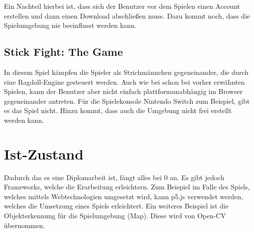 Ein Nachteil hierbei ist, dass sich der Benutzer vor dem Spielen einen Account erstellen
und dann einen Download abschließen muss. Dazu kommt noch, dass die Spielumgebung nie beeinflusst werden kann.

\subsection{Stick Fight: The Game}
In diesem Spiel kämpfen die Spieler als Strichmännchen gegeneinander, die durch eine Ragdoll-Engine gesteuert werden.
Auch wie bei schon bei vorher erwähnten Spielen, kann der Benutzer aber nicht einfach plattformunabhängig im Browser gegeneinander antreten.
Für die Spielekonsole Nintendo Switch zum Beispiel, gibt es das Spiel nicht. Hinzu kommt, dass auch die Umgebung nicht frei erstellt werden kann.

\section{Ist-Zustand}
Dadurch das es eine Diplomarbeit ist, fängt alles bei 0 an. Es gibt jedoch Frameworks,
welche die Erarbeitung erleichtern. Zum Beispiel im Falle des Spiels, welches
mittels Webtechnologien umgesetzt wird, kann p5.js verwendet werden, welches die
Umsetzung eines Spiels erleichtert. Ein weiteres Beispiel ist die Objekterkennung für
die Spielumgebung (Map). Diese wird von Open-CV übernommen.